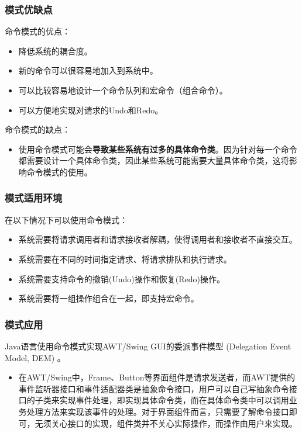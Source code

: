\subsubsection{模式优缺点}
命令模式的优点：
\begin{itemize}
    \item 降低系统的耦合度。
    \item 新的命令可以很容易地加入到系统中。
    \item 可以比较容易地设计一个命令队列和宏命令（组合命令）。
    \item 可以方便地实现对请求的Undo和Redo。
\end{itemize}

命令模式的缺点：
\begin{itemize}
    \item 使用命令模式可能会\textbf{导致某些系统有过多的具体命令类}。因为针对每一个命令都需要设计一个具体命令类，因此某些系统可能需要大量具体命令类，这将影响命令模式的使用。
\end{itemize}

\subsubsection{模式适用环境}
在以下情况下可以使用命令模式：
\begin{itemize}
    \item 系统需要将请求调用者和请求接收者解耦，使得调用者和接收者不直接交互。
    \item 系统需要在不同的时间指定请求、将请求排队和执行请求。
    \item 系统需要支持命令的撤销(Undo)操作和恢复(Redo)操作。
    \item 系统需要将一组操作组合在一起，即支持宏命令。
\end{itemize}

\subsubsection{模式应用}
 Java语言使用命令模式实现AWT/Swing GUI的委派事件模型 (Delegation Event Model, DEM) 。
\begin{itemize}
    \item 在AWT/Swing中，Frame、Button等界面组件是请求发送者，而AWT提供的事件监听器接口和事件适配器类是抽象命令接口，用户可以自己写抽象命令接口的子类来实现事件处理，即实现具体命令类，而在具体命令类中可以调用业务处理方法来实现该事件的处理。对于界面组件而言，只需要了解命令接口即可，无须关心接口的实现，组件类并不关心实际操作，而操作由用户来实现。
\end{itemize}

